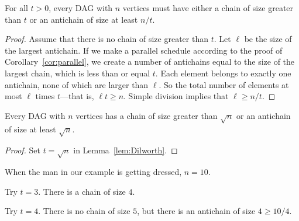 \begin{lemma}[Dilworth]\label{lem:Dilworth}
For all $t>0$, every DAG with $n$ vertices must have either a chain of
size greater than $t$ or an antichain of size at least $n / t$.
\end{lemma}

\begin{proof}
Assume that there is no chain of size greater than $t$.  Let $\ell$ be
the size of the largest antichain.  If we make a parallel schedule
according to the proof of Corollary~\ref{cor:parallel}, we create a
number of antichains equal to the size of the largest chain, which is
less than or equal $t$.  Each element belongs to exactly one
antichain, none of which are larger than $\ell$.  So the total number
of elements at most $\ell$ times $t$---that is, $\ell t \geq n$.
Simple division implies that $\ell \geq n/t$.
\end{proof}

\begin{corollary}\label{cor:Dilworth}
Every DAG with $n$ vertices has a chain of size greater
than $\sqrt{n}$ or an antichain of size at least $\sqrt{n}$.

\begin{proof}
  Set $t = \sqrt{n}$ in Lemma~\ref{lem:Dilworth}.
\end{proof}
\end{corollary}

\begin{example}
When the man in our example is getting dressed, $n = 10$.

Try $t = 3$.  There is a chain of size $4$.

Try $t = 4$.  There is no chain of size $5$, but there is an antichain of
size $4 \geq 10 / 4$.
\end{example}

\begin{problems}
\practiceproblems
{}

\classproblems
{}

\homeworkproblems
{}


\end{problems}

